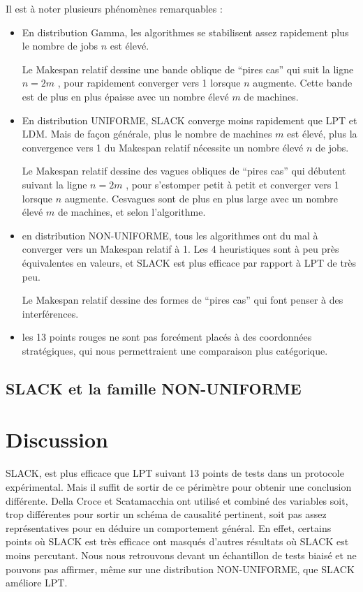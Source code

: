 \documentclass[a4paper,12pt]{report}
\theoremstyle{plain}				%
\theoremstyle{definition}				%
\begin{document}
Il est à noter plusieurs phénomènes remarquables :
\begin{itemize}
	\item En distribution Gamma, les algorithmes se stabilisent 
	assez rapidement plus le nombre de jobs $n$ est élevé.
	
	Le Makespan relatif dessine une bande oblique de ``pires cas'' 
	qui suit la ligne $n = 2m$ , pour rapidement converger vers 1 
	lorsque $n$ augmente. 
	Cette bande est de plus en plus épaisse avec un nombre 
	élevé $m$ de machines.
	 
	\item En distribution UNIFORME, SLACK converge moins rapidement que 
	LPT et LDM. Mais de façon générale, plus le nombre de machines $m$ 
	est élevé, plus la convergence vers 1 du Makespan relatif nécessite 
	un nombre élevé $n$ de jobs.
	
	Le Makespan relatif dessine des vagues obliques de ``pires cas'' 
	qui débutent suivant la ligne $n = 2m$ , pour s'estomper petit à petit 
	et converger vers 1 lorsque $n$ augmente. 
	Cesvagues sont de plus en plus large avec un nombre 
	élevé $m$ de machines, et selon l'algorithme.
	
	\item en distribution NON-UNIFORME, tous les algorithmes ont du mal 
	à converger vers un Makespan relatif à 1. Les 4 heuristiques sont à 
	peu près équivalentes en valeurs, et SLACK est plus efficace par 
	rapport à LPT de très peu.
	
	Le Makespan relatif dessine des formes de ``pires cas'' qui font penser 
	à des interférences.
	
	\item les 13 points rouges ne sont pas forcément placés à des 
	coordonnées stratégiques, qui nous permettraient une comparaison 
	plus catégorique. 
\end{itemize}

\subsection{SLACK et la famille NON-UNIFORME}
\label{ssec:resultatsSLACKNonUniforme}

\section{Discussion} \label{sec:discussion}

SLACK, est plus efficace que LPT suivant 13 points de tests 
  dans un protocole expérimental. 
Mais il suffit de sortir de ce périmètre pour obtenir 
  une conclusion différente. 
Della Croce et Scatamacchia ont utilisé et combiné des variables 
  soit, trop différentes pour sortir un schéma de causalité pertinent, 
  soit pas assez représentatives pour en déduire un comportement général.  
En effet, certains points où SLACK est très efficace ont masqués 
  d'autres résultats où SLACK est moins percutant. 
Nous nous retrouvons devant un échantillon de tests biaisé et ne pouvons pas affirmer, même sur une distribution NON-UNIFORME, que SLACK améliore LPT. 
\end{document}
